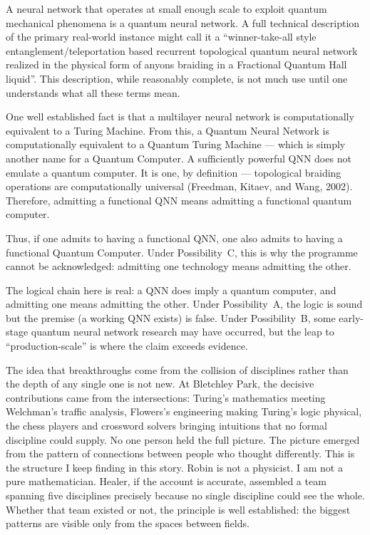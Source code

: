 
A neural network that operates at small enough scale to exploit quantum mechanical phenomena is a quantum neural network. A full technical description of the primary real-world instance might call it a ``winner-take-all style entanglement/teleportation based recurrent topological quantum neural network realized in the physical form of anyons braiding in a Fractional Quantum Hall liquid''. This description, while reasonably complete, is not much use until one understands what all these terms mean.

One well established fact is that a multilayer neural network is computationally equivalent to a Turing Machine. From this, a Quantum Neural Network is computationally equivalent to a Quantum Turing Machine --- which is simply another name for a Quantum Computer. A sufficiently powerful QNN does not emulate a quantum computer. It is one, by definition --- topological braiding operations are computationally universal (Freedman, Kitaev, and Wang, 2002). Therefore, admitting a functional QNN means admitting a functional quantum computer.

Thus, if one admits to having a functional QNN, one also admits to having a functional Quantum Computer. Under Possibility~C, this is why the programme cannot be acknowledged: admitting one technology means admitting the other.

The logical chain here is real: a QNN does imply a quantum computer, and admitting one means admitting the other. Under Possibility~A, the logic is sound but the premise (a working QNN exists) is false. Under Possibility~B, some early-stage quantum neural network research may have occurred, but the leap to ``production-scale'' is where the claim exceeds evidence.

The idea that breakthroughs come from the collision of disciplines rather than the depth of any single one is not new. At Bletchley Park, the decisive contributions came from the intersections: Turing's mathematics meeting Welchman's traffic analysis, Flowers's engineering making Turing's logic physical, the chess players and crossword solvers bringing intuitions that no formal discipline could supply. No one person held the full picture. The picture emerged from the pattern of connections between people who thought differently. This is the structure I keep finding in this story. Robin is not a physicist. I am not a pure mathematician. Healer, if the account is accurate, assembled a team spanning five disciplines precisely because no single discipline could see the whole. Whether that team existed or not, the principle is well established: the biggest patterns are visible only from the spaces between fields.


